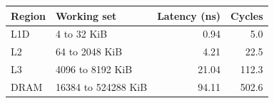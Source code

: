 \begin{tabular}{llrr}
\hline
Region & Working set & Latency (ns) & Cycles \\
\hline
L1D & 4 to 32 KiB & 0.94 & 5.0 \\
L2 & 64 to 2048 KiB & 4.21 & 22.5 \\
L3 & 4096 to 8192 KiB & 21.04 & 112.3 \\
DRAM & 16384 to 524288 KiB & 94.11 & 502.6 \\
\hline
\end{tabular}
